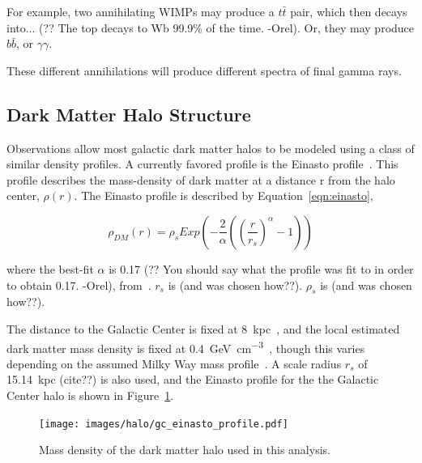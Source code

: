     For example, two annihilating WIMPs may produce a $t\bar{t}$ pair, which then decays into... {\color{red}(?? The top decays to Wb 99.9\% of the time. -Orel)}.
    Or, they may produce $b\bar{b}$, or $\gamma\gamma$.

    These different annihilations will produce different spectra of final gamma rays.
  
  \subsection{Dark Matter Halo Structure}\label{dm_spatial}
    Observations allow most galactic dark matter halos to be modeled using a class of similar density profiles.
    A currently favored profile is the Einasto profile~\cite{einastoprofile1,einastoprofile2}.
    This profile describes the mass-density of dark matter at a distance r from the halo center, $\rho(r)$.
    The Einasto profile is described by Equation~\ref{eqn:einasto},

    \begin{equation} \label{eqn:einasto}
      \rho_{DM} \left( r \right) = \rho_{s} Exp \left( - \frac{2}{\alpha} \left( {\left( \frac{r}{r_s} \right)}^{\alpha} - 1 \right) \right)
    \end{equation}
    
    where the best-fit $\alpha$ is {\color{red}0.17 (?? You should say what the profile was fit to in order to obtain 0.17. -Orel)}, from~\cite{PieriGalaxySims}.
    $r_s$ is {\color{red}(and was chosen how??)}.
    $\rho_s$ is {\color{red}(and was chosen how??)}.

    The distance to the Galactic Center is fixed at \SI{8}{kpc}~\cite{gc_distance_1,gc_distance_2,gc_distance_3}, and the local estimated dark matter mass density is fixed at \SI{0.4}{\GeV\per\cm^3}~\cite{local_dm_density}, though this varies depending on the assumed Milky Way mass profile~\cite{direct_dm_astrophysical_uncertainties}.
    A scale radius $r_s$ of \SI{15.14}{kpc} {\color{red}(cite??)} is also used, and the Einasto profile for the the Galactic Center halo is shown in Figure~\ref{fig:gchalo_density}.
  
    \begin{figure}[ht]
      \centering
      \texttt{[image: images/halo/gc\_einasto\_profile.pdf]}
      \caption[Galactic Center Einasto Halo Density]{
        Mass density of the dark matter halo used in this analysis.
        \\\hspace{\textwidth}
        }
      \label{fig:gchalo_density}
    \end{figure}
    
